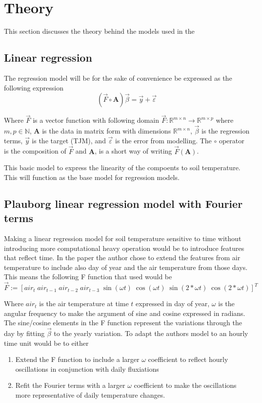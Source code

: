 \section{Theory}\label{sec:theory}

This section discusses the theory behind the models used in the 

\subsection{Linear regression}

The regression model will be for the sake of convenience be expressed as the following expression
$$
\left(\vec{F}\circ \mathbf{A}\right)\vec{\beta}=\vec{y}+\vec{\varepsilon}
$$

Where $\vec{F}$ is a vector function with following domain $\vec{F}:\mathbb{R}^{m\times n}\to \mathbb{R}^{m\times p}$ where $m,p\in \mathbb{N}$, $\mathbf{A}$ is the data in matrix form with dimensions $\mathbb{R}^{m\times n}$, $\vec{\beta}$ is the regression terms, $\vec{y}$ is the target (TJM), and $\vec{\varepsilon}$ is the error from modelling. The $\circ$ operator is the composition of $\vec{F}$ and $\mathbf{A}$, is a short way of writing $\vec{F}(\mathbf{A})$.

This basic model to express the linearity of the compoents to soil temperature. This will function as the base model for regression models. 
\subsection[Plauborg Regression]{Plauborg linear regression model with Fourier terms}

Making a linear regression model for soil temperature sensitive to time without introducing more computational heavy operation would be to introduce features that reflect time. In the paper  the author chose to extend the features from air temperature to include also day of year and the air temperature from those days. This means the following F function that \citeauthor{plauborg_simple_2002} used would be 
$$
\vec{F} := [air_t \; air_{t-1}\; air_{t-2}\; air_{t-3}\; \sin(\omega t) \; \cos(\omega t)\; \sin(2*\omega t)\; \cos(2*\omega t)]^T
$$

Where $air_t$ is the air temperature at time $t$ expressed in day of year, $\omega$ is the angular frequency to make the argument of sine and cosine expressed in radians. The sine/cosine elements in the F function represent the variations through the day by fitting $\vec{\beta}$ to the yearly variation. To adapt the authors model to an hourly time unit would be to either
\begin{enumerate}
	\item Extend the F function to include a larger $\omega$ coefficient to reflect hourly oscillations in conjunction with daily fluxiations
	\item Refit the Fourier terms with a larger $\omega$ coefficient to make the oscillations more representative of daily temperature changes.
\end{enumerate}

